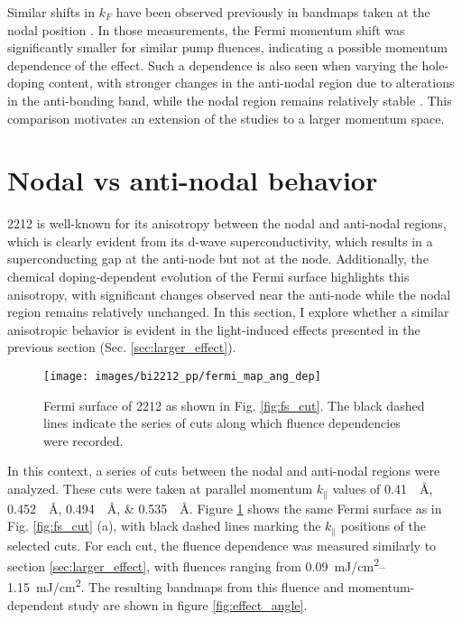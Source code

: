 Similar shifts in $k_F$ have been observed previously in bandmaps taken at the nodal position \cite{rameau_photoinduced_2014}.
In those measurements, the Fermi momentum shift was significantly smaller for similar pump fluences, indicating a possible momentum dependence of the effect.
Such a dependence is also seen when varying the hole-doping content, with stronger changes in the anti-nodal region due to alterations in the anti-bonding band, while the nodal region remains relatively stable \cite{drozdov_phase_2018}.
This comparison motivates an extension of the studies to a larger momentum space.

\section{Nodal vs anti-nodal behavior}
\label{sec:angle}

2212 is well-known for its anisotropy between the nodal and anti-nodal regions, which is clearly evident from its d-wave superconductivity, which results in a superconducting gap at the anti-node but not at the node.
Additionally, the chemical doping-dependent evolution of the Fermi surface highlights this anisotropy, with significant changes observed near the anti-node while the nodal region remains relatively unchanged.
In this section, I explore whether a similar anisotropic behavior is evident in the light-induced effects presented in the previous section (Sec. \ref{sec:larger_effect}).

\begin{figure}[t!]
	\centering
	\texttt{[image: images/bi2212\_pp/fermi\_map\_ang\_dep]}
	\caption{Fermi surface of 2212 as shown in Fig. \ref{fig:fs_cut}. The black dashed lines indicate the series of cuts along which fluence dependencies were recorded.}
	\label{fig:fermimap_angdep}
\end{figure}

In this context, a series of cuts between the nodal and anti-nodal regions were analyzed.
These cuts were taken at parallel momentum $k_\parallel$ values of \qtylist{0.41;0.452;0.494;0.535}{\per\angstrom}.
Figure  \ref{fig:fermimap_angdep} shows the same Fermi surface as in Fig. \ref{fig:fs_cut} (a), with black dashed lines marking the $k_\parallel$ positions of the selected cuts.
For each cut, the fluence dependence was measured similarly to section \ref{sec:larger_effect}, with fluences ranging from \qtyrange{0.09}{1.15}{\milli\joule/\centi\meter\squared}.
The resulting bandmaps from this fluence and momentum-dependent study are shown in figure \ref{fig:effect_angle}.

